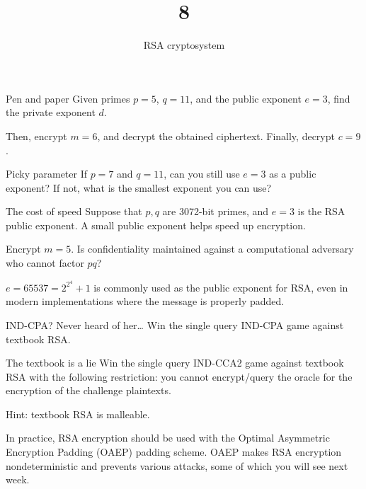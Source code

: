 \documentclass{practice}
\title{8}
\subtitle{RSA cryptosystem}
\date{\DTMdate{2024-10-30}}
\begin{document}
\maketitle

\begin{task}{Pen and paper}
  Given primes $p = 5$, $q = 11$, and the public exponent $e = 3$, find the private exponent $d$.

  Then, encrypt $m = 6$, and decrypt the obtained ciphertext.
  Finally, decrypt $c = 9$.
\end{task}

\begin{task}{Picky parameter}
  If $p = 7$ and $q = 11$, can you still use $e = 3$ as a public exponent?
  If not, what is the smallest exponent you can use?
\end{task}

\begin{task}{The cost of speed}
  Suppose that $p, q$ are 3072-bit primes, and $e = 3$ is the RSA public exponent.
  A small public exponent helps speed up encryption.

  Encrypt $m = 5$.
  Is confidentiality maintained against a computational adversary who cannot factor $pq$?

  \begin{tcolorbox}[title={$e=65537$}]
    $e = 65537 = 2^{2^4} + 1$ is commonly used as the public exponent for RSA, even in modern implementations where the message is properly padded.
  \end{tcolorbox}
\end{task}

\begin{task}{IND-CPA? Never heard of her\dots}
  Win the single query IND-CPA game against textbook RSA.
\end{task}

\begin{task}{The textbook is a lie}
  Win the single query IND-CCA2 game against textbook RSA with the following restriction:
  you cannot encrypt/query the oracle for the encryption of the challenge plaintexts.

  Hint: textbook RSA is malleable.
\end{task}

\begin{tcolorbox}[title=RSA-OAEP]
  In practice, RSA encryption should be used with the Optimal Asymmetric Encryption Padding (OAEP) padding scheme.
  OAEP makes RSA encryption nondeterministic and prevents various attacks, some of which you will see next week.
\end{tcolorbox}
\end{document}
